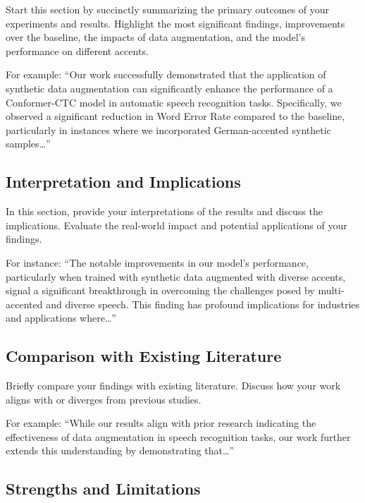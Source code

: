 \documentclass[
]{article}
\begin{document}
Start this section by succinctly summarizing the primary outcomes of
your experiments and results. Highlight the most significant findings,
improvements over the baseline, the impacts of data augmentation, and
the model's performance on different accents.

For example: ``Our work successfully demonstrated that the application
of synthetic data augmentation can significantly enhance the performance
of a Conformer-CTC model in automatic speech recognition tasks.
Specifically, we observed a significant reduction in Word Error Rate
compared to the baseline, particularly in instances where we
incorporated German-accented synthetic samples\ldots{}''

\hypertarget{interpretation-and-implications}{%
\subsection{Interpretation and
Implications}\label{interpretation-and-implications}}

In this section, provide your interpretations of the results and discuss
the implications. Evaluate the real-world impact and potential
applications of your findings.

For instance: ``The notable improvements in our model's performance,
particularly when trained with synthetic data augmented with diverse
accents, signal a significant breakthrough in overcoming the challenges
posed by multi-accented and diverse speech. This finding has profound
implications for industries and applications where\ldots{}''

\hypertarget{comparison-with-existing-literature}{%
\subsection{Comparison with Existing
Literature}\label{comparison-with-existing-literature}}

Briefly compare your findings with existing literature. Discuss how your
work aligns with or diverges from previous studies.

For example: ``While our results align with prior research indicating
the effectiveness of data augmentation in speech recognition tasks, our
work further extends this understanding by demonstrating that\ldots{}''

\hypertarget{strengths-and-limitations}{%
\subsection{Strengths and Limitations}\label{strengths-and-limitations}}
\end{document}
